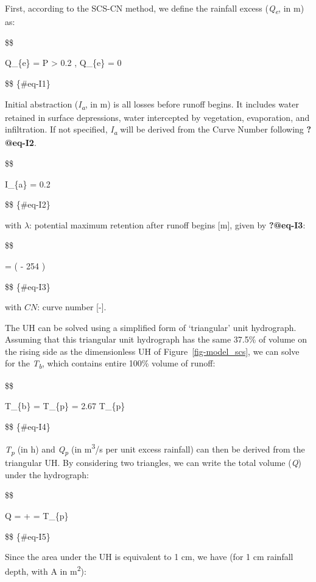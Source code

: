 \documentclass[
  letterpaper,
  DIV=11,
  numbers=noendperiod]{scrreprt}
\begin{document}
First, according to the SCS-CN method, we define the rainfall excess
(\emph{Q\textsubscript{e}}, in m) as:

\$\$

Q\_\{e\} =   P
\textgreater{} 0.2 \lambda ,  Q\_\{e\} = 0

\$\$ \{\#eq-I1\}

Initial abstraction (\emph{I\textsubscript{a}}, in m) is all losses
before runoff begins. It includes water retained in surface depressions,
water intercepted by vegetation, evaporation, and infiltration. If not
specified, \emph{I\textsubscript{a}} will be derived from the Curve
Number following \textbf{?@eq-I2}.

\$\$

I\_\{a\} = 0.2 \cdot \lambda

\$\$ \{\#eq-I2\}

with \(\lambda\): potential maximum retention after runoff begins
{[}m{]}, given by \textbf{?@eq-I3}:

\$\$

\lambda = \bigg(  - 254 \bigg) \cdot {}

\$\$ \{\#eq-I3\}

with \(CN\): curve number {[}-{]}.

The UH can be solved using a simplified form of `triangular' unit
hydrograph. Assuming that this triangular unit hydrograph has the same
37.5\% of volume on the rising side as the dimensionless UH of
Figure~\ref{fig-model_scs}, we can solve for the
\emph{T\textsubscript{b}}, which contains entire 100\% volume of runoff:

\$\$

T\_\{b\} =  \cdot T\_\{p\} = 2.67 \cdot T\_\{p\}

\$\$ \{\#eq-I4\}

\emph{T\textsubscript{p}} (in h) and \emph{Q\textsubscript{p}} (in
m\textsuperscript{3}/s per unit excess rainfall) can then be derived
from the triangular UH. By considering two triangles, we can write the
total volume (\emph{Q}) under the hydrograph:

\$\$

Q =  + 
=   \cdot T\_\{p\}

\$\$ \{\#eq-I5\}

Since the area under the UH is equivalent to 1 cm, we have (for 1 cm
rainfall depth, with A in m\textsuperscript{2}):
\end{document}
